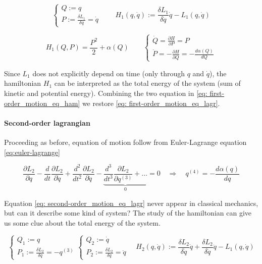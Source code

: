 \begin{equation*}
  \begin{cases}
    Q := q \\
    P := \frac{\delta L_1}{\delta \dot{q}} = \dot{q}
  \end{cases}
  \qquad
  H_1(q, \dot{q}) := \frac{\delta L_1}{\delta \dot{q}} \dot{q} - L_1(q, \dot{q})
\end{equation*}

\begin{equation} \label{eq: first-order_motion_eq_ham}
  H_1(Q, P) = \frac{P^2}{2} + \alpha(Q) \qquad
  \begin{cases}
    \dot{Q} =   \frac{\partial H}{\partial P} = P \\
    \dot{P} = - \frac{\partial H}{\partial Q} = - \frac{d\alpha(Q)}{dQ}
  \end{cases}
\end{equation}

Since $L_1$ does not explicitly depend on time (only through $q$ and $\dot{q}$),
the hamiltonian $H_1$ can be interpreted as the total energy of the system (sum of
kinetic and potential energy).  Combining the two equation in \eqref{eq:
first-order_motion_eq_ham} we restore \eqref{eq: first-order_motion_eq_lagr}.


\paragraph{Second-order lagrangian} Proceeding as before, equation of motion
follow from Euler-Lagrange equation \eqref{eq:euler-lagrange}

\begin{equation} \label{eq: second-order_motion_eq_lagr}
  \frac{\partial L_2}{\partial q} -
  \frac{d}{dt}\frac{\partial L_2}{\partial \dot{q}} +
  \frac{d^2}{dt^2}\frac{\partial L_2}{\partial \ddot{q}} -
  \underbrace{
    \frac{d^3}{dt^3}\frac{\partial L_2}{\partial q^{(3)}} + \ldots
  }_0 = 0
  \quad \Rightarrow \quad
  q^{(4)} = - \frac{d\alpha(q)}{dq}
\end{equation}

Equation \eqref{eq: second-order_motion_eq_lagr} never appear in classical
mechanics, but can it describe some kind of system? The study of the hamiltonian
can give us some clue about the total energy of the system.

\begin{equation*}
  \begin{cases}
    Q_1 := q \\
    P_1 := \frac{\delta L_2}{\delta \dot{q}} = -q^{(3)}
  \end{cases}
  \begin{cases}
    Q_2 := \dot{q} \\
    P_2 := \frac{\delta L_2}{\delta \ddot{q}} = \ddot{q}
  \end{cases}
  \quad
  H_2(q, \dot{q}) :=
    \frac{\delta L_2}{\delta \dot{q}} \dot{q} +
    \frac{\delta L_2}{\delta \ddot{q}} \ddot{q} -
    L_1(q, \dot{q})
\end{equation*}

